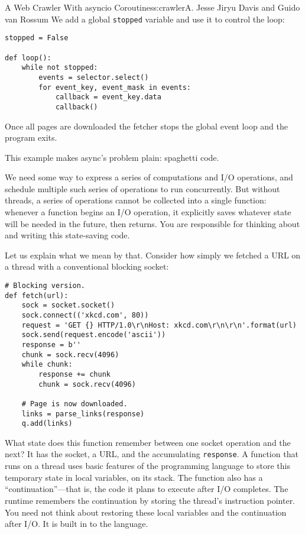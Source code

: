 \begin{aosachapter}{A Web Crawler With asyncio Coroutines}{s:crawler}{A. Jesse Jiryu Davis and Guido van Rossum}
We add a global \texttt{stopped} variable and use it to control the
loop:

\begin{verbatim}
stopped = False

def loop():
    while not stopped:
        events = selector.select()
        for event_key, event_mask in events:
            callback = event_key.data
            callback()
\end{verbatim}

Once all pages are downloaded the fetcher stops the global event loop
and the program exits.

This example makes async's problem plain: spaghetti code.

We need some way to express a series of computations and I/O operations,
and schedule multiple such series of operations to run concurrently. But
without threads, a series of operations cannot be collected into a
single function: whenever a function begins an I/O operation, it
explicitly saves whatever state will be needed in the future, then
returns. You are responsible for thinking about and writing this
state-saving code.

Let us explain what we mean by that. Consider how simply we fetched a
URL on a thread with a conventional blocking socket:

\begin{verbatim}
# Blocking version.
def fetch(url):
    sock = socket.socket()
    sock.connect(('xkcd.com', 80))
    request = 'GET {} HTTP/1.0\r\nHost: xkcd.com\r\n\r\n'.format(url)
    sock.send(request.encode('ascii'))
    response = b''
    chunk = sock.recv(4096)
    while chunk:
        response += chunk
        chunk = sock.recv(4096)
    
    # Page is now downloaded.
    links = parse_links(response)
    q.add(links)
\end{verbatim}

What state does this function remember between one socket operation and
the next? It has the socket, a URL, and the accumulating
\texttt{response}. A function that runs on a thread uses basic features
of the programming language to store this temporary state in local
variables, on its stack. The function also has a ``continuation''---that
is, the code it plans to execute after I/O completes. The runtime
remembers the continuation by storing the thread's instruction pointer.
You need not think about restoring these local variables and the
continuation after I/O. It is built in to the language.


\end{aosachapter}
